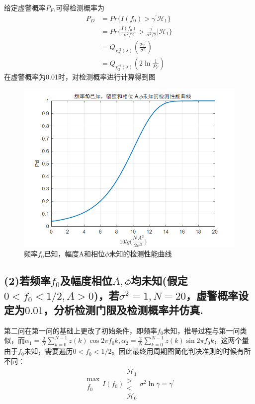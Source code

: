\documentclass[fontset=windows]{article}
\numberwithin{figure}{section}
\begin{document}
给定虚警概率\(P_F\),可得检测概率为
\begin{align*}
    P_D & =Pr\{I(f_0)>\gamma^{\prime}\mathcal{H}_1\}                                        \\
        & =Pr\{\frac{I(f_0)}{\sigma^2/2}>\frac{\gamma^{\prime}}{\sigma^2/2}|\mathcal{H}_1\} \\
        & =Q_{\chi^{\prime2}_2(\lambda)}(\frac{2\gamma^{\prime}}{\sigma^2})                 \\
        & =Q_{\chi^{\prime2}_2(\lambda)}(2\ln \frac{1}{P_F})
\end{align*}
在虚警概率为0.01时，对检测概率进行计算得到图

\begin{figure}[H]
    \centering
    \includegraphics[scale=0.7]{4.1.png}
    \caption{频率\(f_0\)已知，幅度A和相位\(\phi\)未知的检测性能曲线}
    \label{4.1}
\end{figure}

\subsection*{(2)若频率\(f_0\)及幅度相位\(A,\phi \)均未知(假定\(0<f_0<1/2,A>0\))，若\(\sigma^2=1,N=20\)，虚警概率设定为\(0.01\)，分析检测门限及检测概率并仿真.}

第二问在第一问的基础上更改了初始条件，即频率\(f_0\)未知，推导过程与第一问类似，而\(\alpha_1=\frac{2}{N}\sum_{k=0}^{N-1}z(k)\cos 2\pi f_0k,\alpha_2=\frac{2}{N}\sum_{k=0}^{N-1}z(k)\sin 2\pi f_0k\)，这两个量由于\(f_0\)未知，需要遍历\(0<f_0<1/2\)。因此最终用周期图简化判决准则的时候有所不同：
\begin{align*}
    \begin{matrix}
        \max \\f_0
    \end{matrix}
    I(f_0)
    \begin{matrix}
        \mathcal{H}_1 \\
        >             \\
        <             \\
        \mathcal{H}_0
    \end{matrix}
    \sigma^2 \ln \gamma=\gamma^{\prime}
\end{align*}
\end{document}
